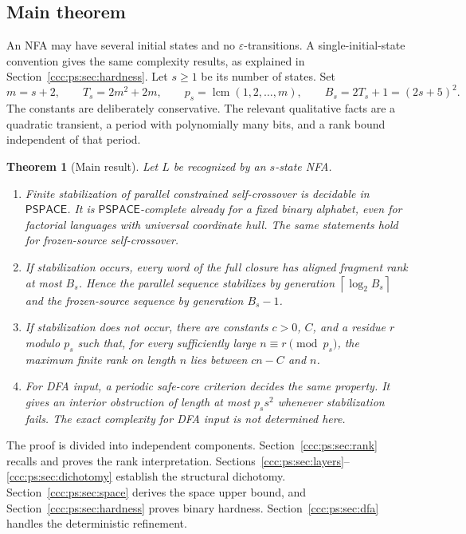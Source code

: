 \documentclass[11pt,letterpaper]{article}
\newtheorem{theorem}{Theorem}[section]
\theoremstyle{definition}
\theoremstyle{remark}
\newcommand{\eps}{\varepsilon}
\newcommand{\clog}[1]{\left\lceil\log_2 #1\right\rceil}
\newcommand{\PSPACE}{\mathsf{PSPACE}}
\begin{document}
\subsection{Main theorem}

An NFA may have several initial states and no $\eps$-transitions. A
single-initial-state convention gives the same complexity results, as
explained in Section~\ref{ccc:ps:sec:hardness}. Let $s\ge1$ be its number of states.
Set
\begin{equation}\label{ccc:ps:eq:universal-constants}
 m=s+2,\qquad T_s=2m^2+2m,\qquad
 p_s=\operatorname{lcm}(1,2,\ldots,m),\qquad
 B_s=2T_s+1=(2s+5)^2.
\end{equation}
The constants are deliberately conservative. The relevant qualitative
facts are a quadratic transient, a period with polynomially many bits,
and a rank bound independent of that period.

\begin{theorem}[Main result]\label{ccc:ps:thm:main}
Let $L$ be recognized by an $s$-state NFA.
\begin{enumerate}
\item Finite stabilization of parallel constrained self-crossover is
 decidable in $\PSPACE$. It is $\PSPACE$-complete already for a fixed binary
 alphabet, even for factorial languages with universal coordinate hull.
 The same statements hold for frozen-source self-crossover.
\item If stabilization occurs, every word of the full closure has aligned
 fragment rank at most $B_s$. Hence the parallel sequence stabilizes by
 generation $\clog{B_s}$ and the frozen-source sequence by generation
 $B_s-1$.
\item If stabilization does not occur, there are constants $c>0$, $C$, and
 a residue $r$ modulo $p_s$ such that, for every sufficiently large
 $n\equiv r\pmod{p_s}$, the maximum finite rank on length $n$ lies between
 $cn-C$ and $n$.
\item For DFA input, a periodic safe-core criterion decides the same
 property. It gives an interior obstruction of length at most $p_s s^2$
 whenever stabilization fails. The exact complexity for DFA input is
 not determined here.
\end{enumerate}
\end{theorem}

The proof is divided into independent components. Section~\ref{ccc:ps:sec:rank}
recalls and proves the rank interpretation. Sections~\ref{ccc:ps:sec:layers}--
\ref{ccc:ps:sec:dichotomy} establish the structural dichotomy.
Section~\ref{ccc:ps:sec:space} derives the space upper bound, and
Section~\ref{ccc:ps:sec:hardness} proves binary hardness.
Section~\ref{ccc:ps:sec:dfa} handles the deterministic refinement.
\end{document}
